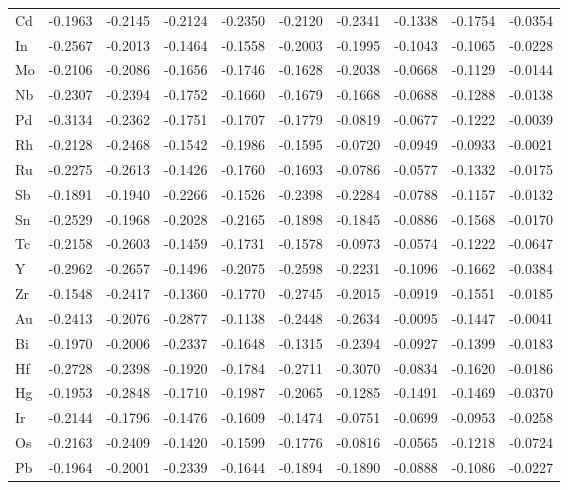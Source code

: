 \begin{table}[htbp]
{\begin{tabular}{l *{9}{l}}
        Cd & -0.1963 & -0.2145 & -0.2124 & -0.2350 & -0.2120 & -0.2341 & -0.1338 & -0.1754 & -0.0354 \\
        In & -0.2567 & -0.2013 & -0.1464 & -0.1558 & -0.2003 & -0.1995 & -0.1043 & -0.1065 & -0.0228 \\
        Mo & -0.2106 & -0.2086 & -0.1656 & -0.1746 & -0.1628 & -0.2038 & -0.0668 & -0.1129 & -0.0144 \\
        Nb & -0.2307 & -0.2394 & -0.1752 & -0.1660 & -0.1679 & -0.1668 & -0.0688 & -0.1288 & -0.0138 \\
        Pd & -0.3134 & -0.2362 & -0.1751 & -0.1707 & -0.1779 & -0.0819 & -0.0677 & -0.1222 & -0.0039 \\
        Rh & -0.2128 & -0.2468 & -0.1542 & -0.1986 & -0.1595 & -0.0720 & -0.0949 & -0.0933 & -0.0021 \\
        Ru & -0.2275 & -0.2613 & -0.1426 & -0.1760 & -0.1693 & -0.0786 & -0.0577 & -0.1332 & -0.0175 \\
        Sb & -0.1891 & -0.1940 & -0.2266 & -0.1526 & -0.2398 & -0.2284 & -0.0788 & -0.1157 & -0.0132 \\
        Sn & -0.2529 & -0.1968 & -0.2028 & -0.2165 & -0.1898 & -0.1845 & -0.0886 & -0.1568 & -0.0170 \\
        Tc & -0.2158 & -0.2603 & -0.1459 & -0.1731 & -0.1578 & -0.0973 & -0.0574 & -0.1222 & -0.0647 \\
        Y  & -0.2962 & -0.2657 & -0.1496 & -0.2075 & -0.2598 & -0.2231 & -0.1096 & -0.1662 & -0.0384 \\
        Zr & -0.1548 & -0.2417 & -0.1360 & -0.1770 & -0.2745 & -0.2015 & -0.0919 & -0.1551 & -0.0185 \\
        Au & -0.2413 & -0.2076 & -0.2877 & -0.1138 & -0.2448 & -0.2634 & -0.0095 & -0.1447 & -0.0041 \\
        Bi & -0.1970 & -0.2006 & -0.2337 & -0.1648 & -0.1315 & -0.2394 & -0.0927 & -0.1399 & -0.0183 \\
        Hf & -0.2728 & -0.2398 & -0.1920 & -0.1784 & -0.2711 & -0.3070 & -0.0834 & -0.1620 & -0.0186 \\
        Hg & -0.1953 & -0.2848 & -0.1710 & -0.1987 & -0.2065 & -0.1285 & -0.1491 & -0.1469 & -0.0370 \\
        Ir & -0.2144 & -0.1796 & -0.1476 & -0.1609 & -0.1474 & -0.0751 & -0.0699 & -0.0953 & -0.0258 \\
        Os & -0.2163 & -0.2409 & -0.1420 & -0.1599 & -0.1776 & -0.0816 & -0.0565 & -0.1218 & -0.0724 \\
        Pb & -0.1964 & -0.2001 & -0.2339 & -0.1644 & -0.1894 & -0.1890 & -0.0888 & -0.1086 & -0.0227 \\

\end{tabular}}
\end{table}
